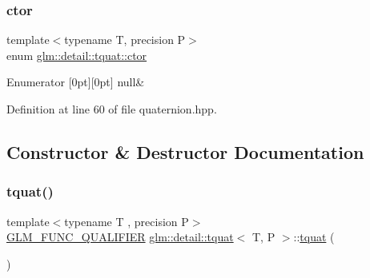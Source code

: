 \subsubsection{\texorpdfstring{ctor}{ctor}}
{\footnotesize\ttfamily template$<$typename T, precision P$>$ \\
enum \hyperlink{structglm_1_1detail_1_1tquat_a61a530a53df553ec85f45e6b5ce6d7c3}{glm\+::detail\+::tquat\+::ctor}}

\begin{DoxyEnumFields}{Enumerator}
[0pt][0pt]{}\mbox{\label{structglm_1_1detail_1_1tquat_a61a530a53df553ec85f45e6b5ce6d7c3a8dde10de7e48095da9f3e497c958227c}} 
null&\\
\hline

\end{DoxyEnumFields}


Definition at line 60 of file quaternion.\+hpp.



\subsection{Constructor \& Destructor Documentation}
\mbox{\label{structglm_1_1detail_1_1tquat_ad7d05952f6137c055c979eff05e7ef55}} 
\subsubsection{\texorpdfstring{tquat()}{tquat()}\hspace{0.1cm}{\footnotesize\ttfamily [1/9]}}
{\footnotesize\ttfamily template$<$typename T , precision P$>$ \\
\hyperlink{setup_8hpp_a33fdea6f91c5f834105f7415e2a64407}{G\+L\+M\+\_\+\+F\+U\+N\+C\+\_\+\+Q\+U\+A\+L\+I\+F\+I\+ER} \hyperlink{structglm_1_1detail_1_1tquat}{glm\+::detail\+::tquat}$<$ T, P $>$\+::\hyperlink{structglm_1_1detail_1_1tquat}{tquat} (\begin{DoxyParamCaption}{ }\end{DoxyParamCaption})}



